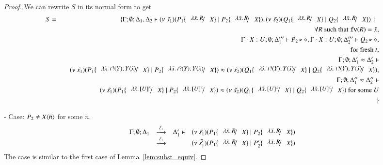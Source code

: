 \begin{proof}
	We can rewrite $S$ in its normal form to get
	\begin{eqnarray*}
		S &=& \set{ \Gamma; \es; \Delta_1, \Delta_2 \proves \newsp{\tilde{s_1}}{P_1 \subst{\abs{\tilde{x}}{R}}{X} \Par P_2 \subst{\abs{\tilde{x}}{R}}{X}}, \newsp{\tilde{s_2}}{Q_1 \subst{\abs{\tilde{x}}{R}}{X} \Par Q_2 \subst{\abs{\tilde{x}}{R}}{X}} \setbar \\
		&& \quad \forall R \textrm{ such that } \fv{R} = \tilde{x},\\
		&& \quad \Gamma \cat X: U; \es;\Delta_1''' \proves P_2 \hastype \Proc, \Gamma \cat X: U; \es; \Delta_2''' \proves Q_2 \hastype \Proc,\\
		&& \quad \textrm{ for fresh } t,\\
		&& \quad \Gamma; \es; \Delta_1' \wb \Delta_2' \proves \\
		&& \quad \newsp{\tilde{s_1}}{P_1 \subst{\abs{\tilde{x}}{\binp{t}{Y} \appl{Y}{\tilde{x}}}}{X} \Par P_2 \subst{\abs{\tilde{x}}{\binp{t}{Y} \appl{Y}{\tilde{x}}}}{X}} \wb \newsp{\tilde{s_2}}{Q_1 \subst{\abs{\tilde{x}}{\binp{t}{Y} \appl{Y}{\tilde{x}}}}{X} \Par Q_2 \subst{\abs{\tilde{x}}{\binp{t}{Y} \appl{Y}{\tilde{x}}}}{X}}, \\
		&& \quad \Gamma; \es; \Delta_1'' \wb \Delta_2'' \proves \\
		&& \quad \newsp{\tilde{s_1}}{P_1 \subst{\abs{\tilde{x}}{\map{U}^x}}{X} \Par P_2 \subst{\abs{\tilde{x}}{\map{U}^x}}{X}} \wb \newsp{\tilde{s_2}}{Q_1 \subst{\abs{\tilde{x}}{\map{U}^x}}{X} \Par Q_2 \subst{\abs{\tilde{x}}{\map{U}^x}}{X}} \textrm{ for some } U \\
		&&}
	\end{eqnarray*}

	\noi - Case: $P_2 \not= X\langle \tilde{n} \rangle$ for some $\tilde{n}$.
%
	\[
	\begin{array}{rcll}
		\Gamma; \es; \Delta_1 &\by{\ell_1}& \Delta_1' \proves& \newsp{\tilde{s_1}}{P_1 \subst{\abs{\tilde{x}}{R}}{X} \Par P_2 \subst{\abs{\tilde{x}}{R}}{X}}\\
		&\by{\ell_1} & & \newsp{\tilde{s_1'}}{P_1 \subst{\abs{\tilde{x}}{R}}{X} \Par P_2' \subst{\abs{\tilde{x}}{R}}{X}}
	\end{array}
	\]
%
	\noi The case is similar to the first case of Lemma~\ref{lem:subst_equiv}.


\end{proof}
